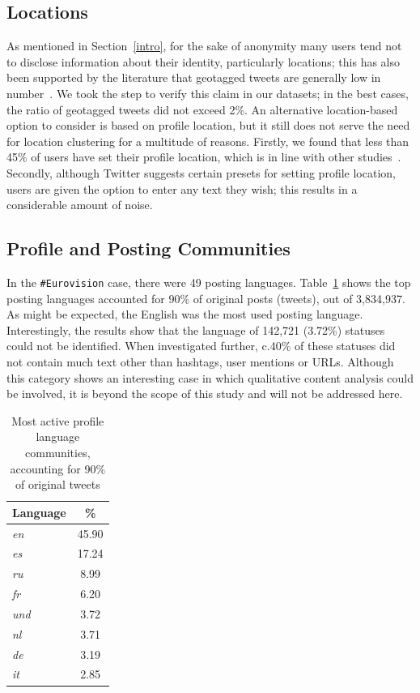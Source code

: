 \subsection{Locations}\label{eurovisionlocations}

As mentioned in Section~\ref{intro}, for the sake of anonymity many
users tend not to disclose information about their identity,
particularly locations; this has also been supported by the literature
that geotagged tweets are generally low in
number~\cite{kang-et-al:2013}. We took the step to verify this claim
in our datasets; in the best cases, the ratio of geotagged tweets did
not exceed 2\%. An alternative location-based option to consider is
based on profile location, but it still does not serve the need for
location clustering for a multitude of reasons. Firstly, we found that
less than 45\% of users have set their profile location, which is in
line with other studies~\cite{graham-et-al:2014}. Secondly, although
Twitter suggests certain presets for setting profile location, users
are given the option to enter any text they wish; this results in a
considerable amount of noise.

\subsection{Profile and Posting Communities}\label{ppcomm}

In the {\texttt{\#Eurovision}} case, there were 49 posting
languages. Table~\ref{tbl:activelangs} shows the top posting languages
accounted for 90\% of original posts (tweets), out of 3,834,937. As
might be expected, the English was the most used posting
language. Interestingly, the results show that the language of 142,721
(3.72\%) statuses could not be identified. When investigated further,
c.40\% of these statuses did not contain much text other than
hashtags, user mentions or URLs. Although this category shows an
interesting case in which qualitative content analysis could be
involved, it is beyond the scope of this study and will not be
addressed here.


\begin{table}[!htb]
\centering
\begin{tabular}{@{}lc}
\toprule
\textbf{Language} & \textbf{\%} \\ 
\midrule
{\emph{en}} & 45.90 \\
{\emph{es}} & 17.24 \\
{\emph{ru}} & 8.99 \\
{\emph{fr}} & 6.20 \\
{\emph{und}} & 3.72 \\
{\emph{nl}} & 3.71 \\
{\emph{de}} & 3.19 \\
{\emph{it}} & 2.85 \\ 
\bottomrule
\end{tabular}
\caption{Most active profile language
  communities, accounting for 90\% of original tweets}
\label{tbl:activelangs}
\end{table}


